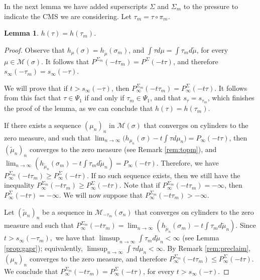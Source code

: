 \documentclass[letterpaper,11pt]{amsart}
\theoremstyle{plain}
\theoremstyle{plain}
\newtheorem{lemma}[proposition]{Lemma}
\theoremstyle{definition}
\theoremstyle{remark}
\def\M{{\mathcal M}}
\begin{document}
In the next lemma we have added superscripts $\Sigma$ and $\Sigma_m$ to the pressure to indicate the CMS we are considering. Let $\tau_m=\tau\circ \pi_m$. 
\begin{lemma}\label{lem:mvstau} $h(\tau)=h(\tau_m)$.\end{lemma}
\begin{proof} Observe that  $h_\mu(\sigma)=h_{\tilde{\mu}}(\sigma_m)$, and $\int \tau d\mu=\int \tau_m d\tilde{\mu}$, for every $\mu\in \M(\sigma)$. It follows that $P^{\Sigma_m}(-t\tau_m)=P^{\Sigma}(-t\tau)$, and therefore $s_\infty(-\tau_m)=s_\infty(-\tau)$. 

We will prove that if $t>s_\infty(-\tau)$, then  $P_\infty^{\Sigma_m}(-t\tau_m)=P^{\Sigma}_\infty(-t\tau)$. It follows from this fact that $\tau\in \Psi_1$ if and only if $\tau_m\in \Psi_1$, and that ${s}_\tau={s}_{\tau_m}$, which finishes the proof of the lemma, as we can conclude that $h(\tau)=h(\tau_m)$.

If there exists a sequence $(\mu_n)_n$ in $\M(\sigma)$ that converges on cylinders to the zero measure, and such that $\lim_{n\to\infty}\big(h_{\mu_n}(\sigma)-t\int \tau d\mu_n\big)=P_\infty(-t\tau)$, then $(\tilde{\mu}_n)_n$ converges to the zero measure (see Remark \ref{rem:topm}), and $\lim_{n\to\infty}(h_{\tilde{\mu}_n}(\sigma_m)-t\int \tau_m d\tilde{\mu}_n)=P_\infty(-t\tau)$. Therefore, we have $P_\infty^{\Sigma_m}(-t\tau_m)\ge P^{\Sigma}_\infty(-t\tau)$. If no such sequence exists, then we still have the inequality $P_\infty^{\Sigma_m}(-t\tau_m)\ge P^{\Sigma}_\infty(-t\tau)$. Note that if  $P_\infty^{\Sigma_m}(-t\tau_m)=-\infty$, then $P_\infty^{\Sigma}(-t\tau)=-\infty$. We will now suppose that $P_\infty^{\Sigma_m}(-t\tau_m)>-\infty$. 

Let  $(\tilde{\mu}_n)_n$ be a sequence in $\M_{-\tau_m}(\sigma_n)$  that converges on cylinders to the zero measure and such that $P_\infty^{\Sigma_m}(-t\tau_m)=\lim_{n\to\infty}(h_{\tilde{\mu}_n}(\sigma_m)-t\int \tau_m d\tilde{\mu}_n)$. Since $t>s_\infty(-\tau_m),$ we have that $\limsup_{n\to\infty}\int \tau_m d\tilde{\mu}_n<\infty$ (see  Lemma \ref{prop:gapr}); equivalently, $\limsup_{n\to\infty}\int \tau d\mu_n<\infty$. By Remark \ref{rem:preclaim}, $(\mu_n)_n$ converges to the zero measure, and therefore $P_\infty^{\Sigma_m}(-t\tau_m)\le P^{\Sigma}_\infty(-t\tau)$. We conclude that $P_\infty^{\Sigma_m}(-t\tau_m)=P^{\Sigma}_\infty(-t\tau)$, for every $t>s_\infty(-\tau)$.
\end{proof}
\end{document}
